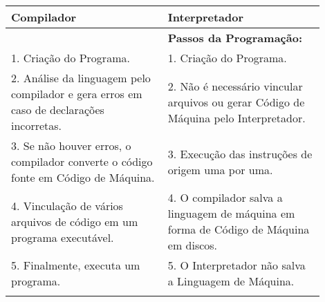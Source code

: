 \documentclass[12pt,a4paper]{abntex2}
\begin{document}
\begin{tabular}{|p{0.45\linewidth}|p{0.45\linewidth}|}
\hline
\textbf{Compilador} & \textbf{Interpretador} \\
\hline

\begin{comment}
\textbf{Passos da Programação:} & \textbf{Passos da Programação:} \\
\hline
1. Criação do Programa. & 1. Criação do Programa. \\
\hline
2. Análise da linguagem pelo compilador e gera erros em caso de declarações incorretas.
    & 2. Não é necessário vincular arquivos ou gerar Código de Máquina pelo Interpretador. \\
\hline
3. Se não houver erros, o compilador converte o código fonte em Código de Máquina.
    & 3. Execução das instruções de origem uma por uma. \\
\hline
4. Vinculação de vários arquivos de código em um programa executável.
& 4. O compilador salva a linguagem de máquina em forma de Código de Máquina em discos. \\
\hline
5. Finalmente, executa um programa. & 5. O Interpretador não salva a Linguagem de Máquina. \\
\hline
\end{comment}


\end{tabular}
\end{document}
